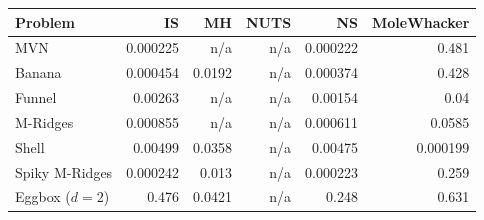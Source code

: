 \begin{tabular}{lrrrrr}
\toprule
Problem & IS & MH & NUTS & NS & MoleWhacker \\
\midrule
MVN & 0.000225 & n/a & n/a & 0.000222 & 0.481 \\
Banana & 0.000454 & 0.0192 & n/a & 0.000374 & 0.428 \\
Funnel & 0.00263 & n/a & n/a & 0.00154 & 0.04 \\
M-Ridges & 0.000855 & n/a & n/a & 0.000611 & 0.0585 \\
Shell & 0.00499 & 0.0358 & n/a & 0.00475 & 0.000199 \\
Spiky M-Ridges & 0.000242 & 0.013 & n/a & 0.000223 & 0.259 \\
\midrule
Eggbox ($d=2$) & 0.476 & 0.0421 & n/a & 0.248 & 0.631 \\
\bottomrule
\end{tabular}
